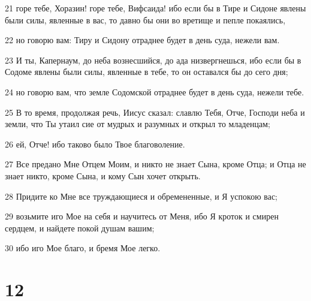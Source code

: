\par 21 горе тебе, Хоразин! горе тебе, Вифсаида! ибо если бы в Тире и Сидоне явлены были силы, явленные в вас, то давно бы они во вретище и пепле покаялись,
\par 22 но говорю вам: Тиру и Сидону отраднее будет в день суда, нежели вам.
\par 23 И ты, Капернаум, до неба вознесшийся, до ада низвергнешься, ибо если бы в Содоме явлены были силы, явленные в тебе, то он оставался бы до сего дня;
\par 24 но говорю вам, что земле Содомской отраднее будет в день суда, нежели тебе.
\par 25 В то время, продолжая речь, Иисус сказал: славлю Тебя, Отче, Господи неба и земли, что Ты утаил сие от мудрых и разумных и открыл то младенцам;
\par 26 ей, Отче! ибо таково было Твое благоволение.
\par 27 Все предано Мне Отцем Моим, и никто не знает Сына, кроме Отца; и Отца не знает никто, кроме Сына, и кому Сын хочет открыть.
\par 28 Придите ко Мне все труждающиеся и обремененные, и Я успокою вас;
\par 29 возьмите иго Мое на себя и научитесь от Меня, ибо Я кроток и смирен сердцем, и найдете покой душам вашим;
\par 30 ибо иго Мое благо, и бремя Мое легко.

\chapter{12}


